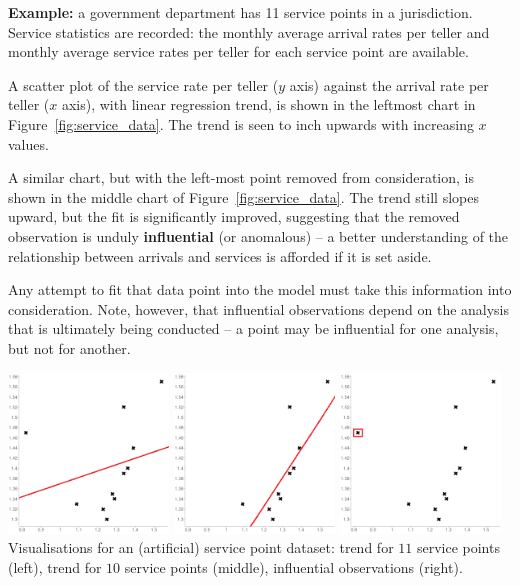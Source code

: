 \documentclass[20pt,landscape,footrule,headrule]{foils}
\begin{document}
\textbf{Example:} 
a government department has 11 service points in a jurisdiction. Service statistics are recorded: the monthly average arrival rates per teller and monthly average service rates per teller for each service point are available. \par A scatter plot of the service rate per teller ($y$ axis) against the arrival rate per teller ($x$ axis), with linear regression trend, is shown in the leftmost chart in Figure~\ref{fig:service_data}. The trend is seen to inch upwards with increasing $x$ values. \par A similar chart, but with the left-most point removed from consideration, is shown in the middle chart of  Figure~\ref{fig:service_data}. The trend still slopes upward, but the fit is significantly improved, suggesting that the removed observation is unduly \textbf{influential} (or anomalous) -- a better understanding of the relationship between arrivals and services is afforded if it is set aside. \par Any attempt to fit that data point into the model must take this information into consideration. Note, however, that influential observations depend on the analysis that is ultimately being conducted -- a point may be influential for one analysis, but not for another. 


\begin{center}
\includegraphics[width=0.32\textwidth]{Images/scatter_plot_linear_1}\quad
\includegraphics[width=0.32\textwidth]{Images/scatter_plot_linear_2}\quad
\includegraphics[width=0.32\textwidth]{Images/scatter_plot_2} \\ Visualisations for an (artificial) service point dataset: trend for $11$ service points (left), trend for $10$ service points (middle), influential observations (right).
\end{center}
\end{document}
